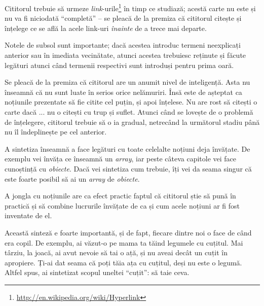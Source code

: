 Cititorul trebuie să urmeze
\textsl{link}-urile\footnote{\url{http://en.wikipedia.org/wiki/Hyperlink}}
%
%
în timp ce
studiază; acestă carte nu este și nu va fi niciodată ``completă'' -- se pleacă
de la premiza că cititorul citește și înțelege ce se află la acele link-uri
\textit{înainte} de a trece mai departe.

Notele de subsol sunt importante; dacă acestea introduc termeni neexplicați
anterior sau în imediata vecinătate, atunci acestea trebuiesc reținute și
făcute legături atunci când termenii respectivi sunt introduși pentru prima
oară.

Se pleacă de la premiza că cititorul are un anumit nivel de inteligență. Asta
nu înseamnă că nu sunt luate în serios orice nelămuriri. Însă este de așteptat
ca noțiunile prezentate să fie citite cel puțin, și apoi înțelese. Nu are rost
să citești o carte dacă ... nu o citești cu trup și suflet. Atunci când se
lovește de o problemă de înțelegere, cititorul trebuie să o ia gradual,
netrecând la următorul stadiu până nu îl îndeplinește pe cel anterior.



A sintetiza înseamnă a face legături cu toate celelalte noțiuni
deja învățate. De exemplu vei învăța ce înseamnă un \textit{array}, iar peste
câteva capitole vei face cunoștință cu \textit{obiecte}. Dacă vei sintetiza
cum trebuie, îți vei da seama singur că este foarte posibil
să ai un \textit{array} de \textit{obiecte}.

A jongla cu noțiunile are ca efect practic faptul că cititorul știe
să pună în practică și să combine lucrurile învățate de ca și cum
acele noțiuni ar fi fost inventate de el.


Această sinteză e foarte importantă, și de fapt, fiecare dintre noi o face de
când era copil. De exemplu, ai văzut-o pe mama ta tăind legumele cu cuțitul.
Mai târziu, la joacă, ai avut nevoie să tai o ață, și nu aveai decât un cuțit
în apropiere. Ți-ai dat seama că poți tăia ața cu cuțitul, deși nu este
o legumă. Altfel spus, ai sintetizat scopul uneltei ``cuțit'': să taie ceva.

